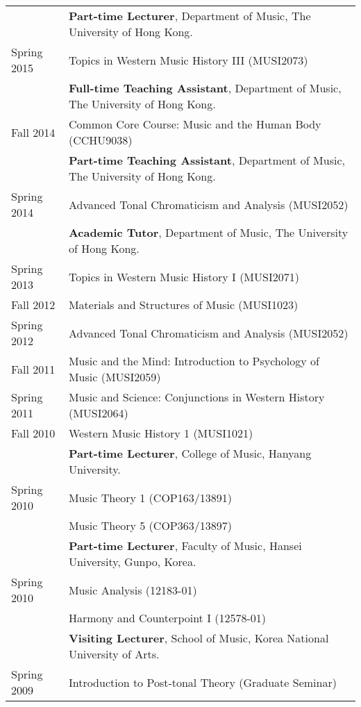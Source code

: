 \documentclass[letter,11pt,draft]{article}
\begin{document}
  \hspace*{-0.25cm}
  \begin{tabular}{p{2.5cm} l}
    & \textbf{Part-time Lecturer}, Department of Music, The University of Hong Kong.\\
    Spring 2015 & Topics in Western Music History III (MUSI2073)\\[2mm]
    
    & \textbf{Full-time Teaching Assistant}, Department of Music, The University of Hong Kong.\\
    Fall 2014 & Common Core Course: Music and the Human Body (CCHU9038)\\[2mm]
    
    & \textbf{Part-time Teaching Assistant}, Department of Music, The University of Hong Kong.\\
    Spring 2014 & Advanced Tonal Chromaticism and Analysis (MUSI2052)\\[2mm]
    
    & \textbf{Academic Tutor}, Department of Music, The University of Hong Kong.\\
    Spring 2013 & Topics in Western Music History I (MUSI2071)\\
    Fall 2012 & Materials and Structures of Music (MUSI1023)\\
    Spring 2012 & Advanced Tonal Chromaticism and Analysis (MUSI2052)\\
    Fall 2011 & Music and the Mind: Introduction to Psychology of Music (MUSI2059)\\
    Spring 2011 & Music and Science: Conjunctions in Western History (MUSI2064)\\
    Fall 2010 & Western Music History 1 (MUSI1021)\\[2mm]
    
    & \textbf{Part-time Lecturer}, College of Music, Hanyang University.\\
    Spring 2010 & Music Theory 1 (COP163/13891)\\
    & Music Theory 5 (COP363/13897)\\[2mm]

		& \textbf{Part-time Lecturer}, Faculty of Music, Hansei University, Gunpo, Korea.\\
		Spring 2010 & Music Analysis (12183-01)\\
		& Harmony and Counterpoint I (12578-01)\\[2mm]
		
		& \textbf{Visiting Lecturer}, School of Music, Korea National University of Arts.\\
		Spring 2009 & Introduction to Post-tonal Theory (Graduate Seminar)
  \end{tabular}
  
\end{document}
